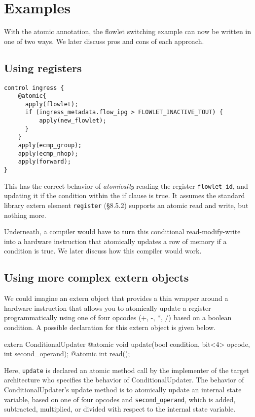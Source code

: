 \section{Examples}

With the atomic annotation, the flowlet switching example can now be written in
one of two ways. We later discuss pros and cons of each approach.

\subsection{Using registers}

\begin{verbatim}
control ingress {
    @atomic{
      apply(flowlet);
      if (ingress_metadata.flow_ipg > FLOWLET_INACTIVE_TOUT) {
          apply(new_flowlet);
      }
    }
    apply(ecmp_group);
    apply(ecmp_nhop);
    apply(forward);
}
\end{verbatim}

This has the correct behavior of \textit{atomically} reading the register
\texttt{flowlet\_id}, and updating it if the condition within the if clause is
true. It assumes the standard library extern element \texttt{register}
(\S8.5.2) supports an atomic read and write, but nothing more.

Underneath, a compiler would have to turn this conditional read-modify-write
into a hardware instruction that atomically updates a row of memory if a
condition is true. We later discuss how this compiler would work.

\subsection{Using more complex extern objects}

We could imagine an extern object that provides a thin wrapper around a
hardware instruction that allows you to atomically update a register
programmatically using one of four opcodes (+, -, *, /) based on a boolean
condition.  A possible declaration for this extern object is given below.

extern ConditionalUpdater {
  @atomic void update(bool condition, bit<4> opcode, int second_operand);
  @atomic int read();
}

Here, \texttt{update} is declared an atomic method call by the implementer of
the target architecture who specifies the behavior of ConditionalUpdater.  The
behavior of ConditionalUpdater's update method is to atomically update an
internal state variable, based on one of four opcodes and
\texttt{second_operand}, which is added, subtracted, multiplied, or divided
with respect to the internal state variable.

